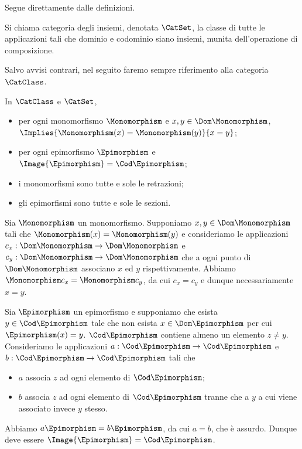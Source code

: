 \Proof Segue direttamente dalle definizioni. \EndProof
\begin{Definition}
	Si chiama categoria degli insiemi, denotata $\CatSet$, la classe di tutte le applicazioni tali che dominio e codominio siano insiemi, munita dell'operazione di composizione.
\end{Definition}
\par Salvo avvisi contrari, nel seguito faremo sempre riferimento alla categoria $\CatClass$.
\begin{Theorem}
	In $\CatClass$ e $\CatSet$,
	\begin{itemize}
		\item per ogni monomorfismo $\Monomorphism$ e $x, y \in
		\Dom \Monomorphism$, $\Implies{\Monomorphism(x) =
		\Monomorphism(y)}{x = y}$;
		\item per ogni epimorfismo $\Epimorphism$ e
		$\Image{\Epimorphism} = \Cod \Epimorphism$;
		\item i monomorfismi sono tutte e sole le retrazioni;
		\item gli epimorfismi sono tutte e sole le sezioni.
	\end{itemize}
\end{Theorem}
\Proof Sia $\Monomorphism$ un monomorfismo. Supponiamo $x, y \in
\Dom \Monomorphism$ tali che $\Monomorphism(x) = \Monomorphism(y)$ e
consideriamo le applicazioni $c_x: \Dom \Monomorphism \rightarrow
\Dom \Monomorphism$ e $c_y: \Dom \Monomorphism \rightarrow
\Dom \Monomorphism$ che a ogni punto di $\Dom \Monomorphism$ associano $x$
ed $y$ rispettivamente. Abbiamo $\Monomorphism c_x = \Monomorphism c_y$,
da cui $c_x = c_y$ e dunque necessariamente $x = y$.
\par Sia $\Epimorphism$ un epimorfismo e supponiamo che esista $y \in
\Cod \Epimorphism$ tale che non esista $x \in \Dom \Epimorphism$ per cui
$\Epimorphism(x) = y$. $\Cod \Epimorphism$ contiene almeno un elemento
$z \neq y$. Consideriamo le applicazioni $a: \Cod \Epimorphism \rightarrow
\Cod \Epimorphism$ e $b: \Cod \Epimorphism \rightarrow \Cod \Epimorphism$
tali che
\begin{itemize}
	\item $a$ associa $z$ ad ogni elemento di $\Cod \Epimorphism$;
	\item $b$ associa $z$ ad ogni elemento di $\Cod \Epimorphism$
	tranne che a $y$ a cui viene associato invece $y$ stesso.
\end{itemize}
Abbiamo $a \Epimorphism = b \Epimorphism$, da cui $a = b$, che \`e
assurdo. Dunque deve essere $\Image{\Epimorphism} = \Cod \Epimorphism$.
